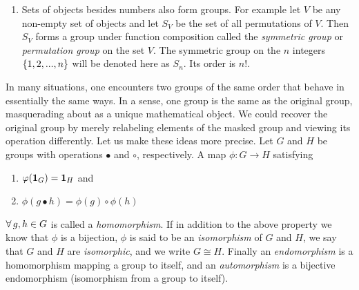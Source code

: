 \begin{example*}{}{}
\begin{enumerate}
\begin{equation}
\begin{aligned}
                         &=\set{2+4(1+m_{3}+m_{4})\suchthat m_{3},m_{4}
                             \in \Z}\\
                         &=\set{2+4m\suchthat m\in \Z}\\
                         &=\bar{2}
          \end{aligned}
        \end{equation}
        It should be clear from the above that $\bar{0}$ is the identity
        element and $\Z_n$ is abelian and cyclic. I would
        also like to emphasize that the addition defined in 
         and \eqref{eq:chgtmaad2} is not the same
        addition as over the integers, even though I have chosen the same
        symbol for both cases. One should always be careful of what group
        operation is meant when the author is being lazy. 
  \item Sets of objects besides numbers also form groups. For example let $V$ 
        be any non-empty set of objects and let $S_{V}$ be the set of all
        permutations of $V$. Then $S_{V}$ forms a group under function
        composition called the {\it symmetric group} 
        or {\it permutation group} on the set $V$.
        The symmetric group on the $n$ integers $\left\{1,2,...,n\right\}$ will be
        denoted here as $S_n$. Its order is $n!$.
\end{enumerate}
\end{example*}

In many situations, one encounters two groups of the same order that behave in
essentially the same ways. In a sense, one group is the same as the original group,
masquerading about as a unique mathematical object. We could recover the
original group by merely relabeling elements of the masked group and viewing
its operation differently. Let us make these ideas more precise.
Let $G$ and $H$ be groups with operations $\bullet$ and
$\circ$, respectively. A map $\phi : G\to H$ satisfying
\begin{enumerate}
  \item $\varphi({\mathbf 1}_G)={\mathbf 1}_H$ and
  \item $\phi(g \bullet h)=\phi(g)\circ\phi(h)$
\end{enumerate}
$\operatorname{\forall} g,h\in G$ is called a {\it homomorphism}. 
If in addition to the above property we know that $\phi$ is a bijection, 
$\phi$ is said to be an {\it isomorphism} of $G$ and 
$H$, we say that $G$ and $H$ are {\it isomorphic}, and we write $G\cong H$. 
Finally an {\it endomorphism} is a homomorphism 
mapping a group to itself, and an {\it automorphism}
is a bijective endomorphism (isomorphism from a group to itself).

